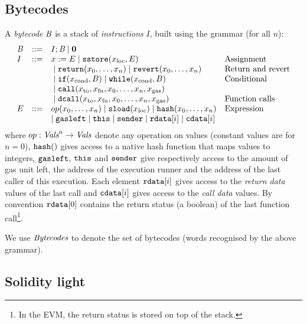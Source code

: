 \documentclass[12pt]{extarticle}
\begin{document}
\subsection{Bytecodes}
A \emph{bytecode} $\textit{B}$ is a stack of \emph{instructions} $I$, built using the grammar (for all $n$):
$$\begin{array}{lcll}
\textit{B} &:: =& I ; \textit{B} \mid \mathbf{0} \\
I & :: =& x:=E \mid \mathtt{sstore}(x_\textrm{loc},E) & \hbox{Assignment} \\
&&{}\mid \mathtt{return}(x_0,\dots,x_n) \mid \mathtt{revert}(x_0,\dots,x_n) & \hbox{Return and revert} \\
&& {}\mid \mathtt{if}(x_\textrm{cond}, B) \mid \mathtt{while}(x_\textrm{cond},B)  & \hbox{Conditional}\\
&&{}\mid \mathtt{call}(x_\textrm{to}, x_\textrm{fn}, x_0, \dots, x_n,x_\textrm{gas})\\
&&{}\mid \mathtt{dcall}(x_\textrm{to}, x_\textrm{fn}, x_0, \dots, x_n,x_\textrm{gas})
 & \hbox{Function calls} \\
E & ::= & op(x_0,\dots,x_n)\mid \mathtt{sload}(x_\textrm{loc})\mid\mathtt{hash}(x_0,\dots,x_n) & \hbox{Expression} \\ 
&& \mid \texttt{gasleft} \mid \texttt{this} \mid \mathtt{sender}\mid \mathtt{rdata}[i] \mid\mathtt{cdata}[i] 
\end{array}
$$
where $op:\textit{Vals}^n\to \textit{Vals}$ denote any operation on values (constant values are for $n=0$), $\mathtt{hash}()$ gives access to a native hash function that maps values to integers, 
$\texttt{gasleft}$, $\texttt{this}$ and $\texttt{sender}$ give respectively access to the amount of gas unit left, the address of the execution runner and the address of the last caller of this execution. 
Each element $\mathtt{rdata}[i]$ gives access to the \emph{return data} values of the last call and 
$\mathtt{cdata}[i]$ gives access to the \emph{call data} values. By convention $\mathtt{rdata}[0]$ contains the return status (a boolean) of the last function call\footnote{In the EVM, the return status is stored on top of the stack.}.

We use $\textit{Bytecodes}$ to denote the set of bytecodes (words recognised by the above grammar).

\subsection{Solidity light}
\end{document}
